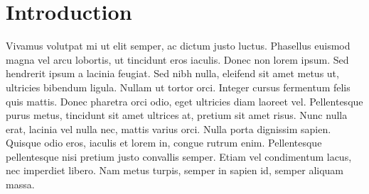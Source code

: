 \section{Introduction}
Vivamus volutpat mi ut elit semper, ac dictum justo luctus. Phasellus euismod
magna vel arcu lobortis, ut tincidunt eros iaculis. Donec non lorem ipsum. Sed
hendrerit ipsum a lacinia feugiat. Sed nibh nulla, eleifend sit amet metus ut,
ultricies bibendum ligula. Nullam ut tortor orci. Integer cursus fermentum
felis quis mattis. Donec pharetra orci odio, eget ultricies diam laoreet vel.
Pellentesque purus metus, tincidunt sit amet ultrices at, pretium sit amet
risus. Nunc nulla erat, lacinia vel nulla nec, mattis varius orci. Nulla porta
dignissim sapien. Quisque odio eros, iaculis et lorem in, congue rutrum enim.
Pellentesque pellentesque nisi pretium justo convallis semper. Etiam vel
condimentum lacus, nec imperdiet libero. Nam metus turpis, semper in sapien id,
semper aliquam massa.
